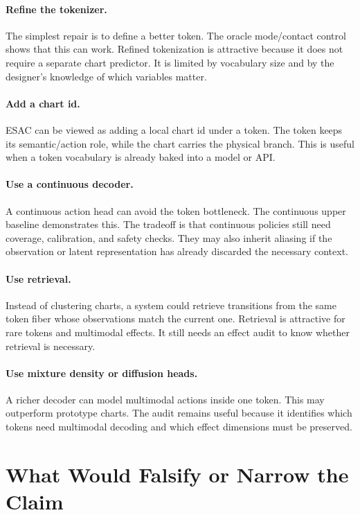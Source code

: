 \documentclass{article}
\begin{document}
\paragraph{Refine the tokenizer.}
The simplest repair is to define a better token. The oracle mode/contact
control shows that this can work. Refined tokenization is attractive because it
does not require a separate chart predictor. It is limited by vocabulary size
and by the designer's knowledge of which variables matter.

\paragraph{Add a chart id.}
ESAC can be viewed as adding a local chart id under a token. The token keeps its
semantic/action role, while the chart carries the physical branch. This is
useful when a token vocabulary is already baked into a model or API.

\paragraph{Use a continuous decoder.}
A continuous action head can avoid the token bottleneck. The continuous upper
baseline demonstrates this. The tradeoff is that continuous policies still need
coverage, calibration, and safety checks. They may also inherit aliasing if the
observation or latent representation has already discarded the necessary
context.

\paragraph{Use retrieval.}
Instead of clustering charts, a system could retrieve transitions from the same
token fiber whose observations match the current one. Retrieval is attractive
for rare tokens and multimodal effects. It still needs an effect audit to know
whether retrieval is necessary.

\paragraph{Use mixture density or diffusion heads.}
A richer decoder can model multimodal actions inside one token. This may
outperform prototype charts. The audit remains useful because it identifies
which tokens need multimodal decoding and which effect dimensions must be
preserved.

\section{What Would Falsify or Narrow the Claim}
\end{document}
